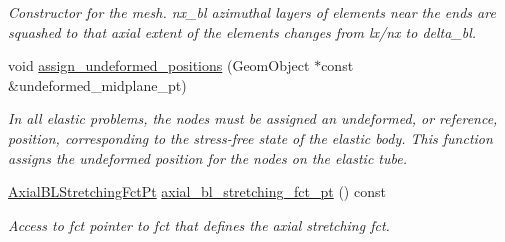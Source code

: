 \begin{DoxyCompactItemize}
\begin{DoxyCompactList}\small\item\em Constructor for the mesh. nx\+\_\+bl azimuthal layers of elements near the ends are squashed to that axial extent of the elements changes from lx/nx to delta\+\_\+bl. \end{DoxyCompactList}\item 
void \hyperlink{classoomph_1_1CircularCylindricalShellMesh_a03bba13301e4dec893d73716e146c71d}{assign\+\_\+undeformed\+\_\+positions} (Geom\+Object $\ast$const \&undeformed\+\_\+midplane\+\_\+pt)
\begin{DoxyCompactList}\small\item\em In all elastic problems, the nodes must be assigned an undeformed, or reference, position, corresponding to the stress-\/free state of the elastic body. This function assigns the undeformed position for the nodes on the elastic tube. \end{DoxyCompactList}\item 
\hyperlink{classoomph_1_1CircularCylindricalShellMesh_a770336fa72e8911f31b9fe3f70197a51}{Axial\+B\+L\+Stretching\+Fct\+Pt} \hyperlink{classoomph_1_1CircularCylindricalShellMesh_aa9c69dc3c6692d19706178d558d07f86}{axial\+\_\+bl\+\_\+stretching\+\_\+fct\+\_\+pt} () const
\begin{DoxyCompactList}\small\item\em Access to fct pointer to fct that defines the axial stretching fct. \end{DoxyCompactList}\end{DoxyCompactItemize}
